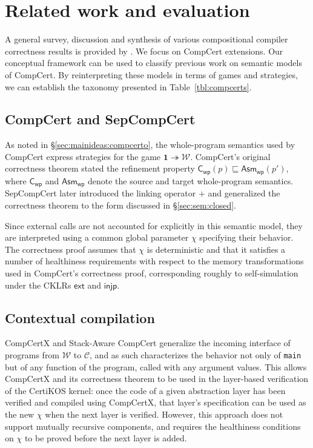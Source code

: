 \documentclass[draft,11pt]{report}
\newcommand{\kw}[1]{\ensuremath{ \mathsf{#1} }}
\newcommand{\refby}{\sqsubseteq} %
\begin{document}
\section{Related work and evaluation} \label{sec:rw} %

A general survey,
discussion and synthesis of various
compositional compiler correctness results
is provided by \citet{next700}.
We focus on CompCert extensions.
Our conceptual framework
can be used to classify previous work
on semantic models of CompCert.
By reinterpreting these models
in terms of games and strategies,
we can establish the taxonomy presented in
Table~\ref{tbl:compcerts}.

\subsection{CompCert and SepCompCert} %

As noted in \S\ref{sec:mainideas:compcerto},
the whole-program semantics used by CompCert
express strategies for the game
$\mathbf{1} \twoheadrightarrow \mathcal{W}$.
CompCert's original correctness theorem
stated the refinement property
$\kw{C}_\kw{wp}(p) \refby \kw{Asm}_\kw{wp}(p')$,
where $\kw{C}_\kw{wp}$ and $\kw{Asm}_\kw{wp}$
denote the source and target whole-program semantics.
SepCompCert \citep{sepcompcert}
later introduced the linking operator $+$
and generalized the correctness theorem to
the form discussed in \S\ref{sec:sem:closed}.

Since external calls are not accounted for explicitly
in this semantic model,
they are interpreted %
using a common global parameter $\chi$
specifying their behavior.
The correctness proof assumes that $\chi$ is deterministic
and that it satisfies a number of healthiness requirements
with respect to the memory transformations
used in CompCert's correctness proof,
corresponding roughly to self-simulation
under the CKLRs $\kw{ext}$ and $\kw{injp}$.


\subsection{Contextual compilation} %

CompCertX \citep{popl15} and
Stack-Aware CompCert \citep{stackaware}
generalize
the incoming interface of programs
from $\mathcal{W}$ to $\mathcal{C}$,
and as such characterizes the behavior
not only of \texttt{main}
but of any function of the program,
called with any argument values.
This allows CompCertX and its correctness theorem
to be used in the layer-based verification of
the CertiKOS kernel:
once the code of a given abstraction layer has been verified
and compiled using CompCertX,
that layer's specification can be used as the new $\chi$
when the next layer is verified.
However,
this approach does not support
mutually recursive components,
and requires the healthiness conditions on $\chi$
to be proved before the next layer is added.
\end{document}
